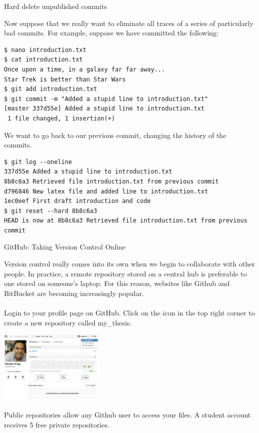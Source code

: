 \documentclass[10pt]{beamer}
\begin{document}
\begin{frame}[fragile]{Hard delete unpublished commits}

Now suppose that we really want to eliminate all traces of a series of particularly bad commits. For example, suppose we have committed the following:

\begin{lstlisting}
$ nano introduction.txt
$ cat introduction.txt
Once upon a time, in a galaxy far far away...
Star Trek is better than Star Wars
$ git add introduction.txt
$ git commit -m "Added a stupid line to introduction.txt"
[master 337d55e] Added a stupid line to introduction.txt
 1 file changed, 1 insertion(+)
\end{lstlisting}

We want to go back to our previous commit, changing the history of the commits.

\begin{lstlisting}
$ git log --oneline
337d55e	Added a stupid line to introduction.txt
8b8c6a3	Retrieved file introduction.txt from previous commit
d796846	New latex file and added line to introduction.txt
1ec0eef	First draft introduction and code
$ git reset --hard 8b8c6a3
HEAD is now at 8b8c6a3 Retrieved file introduction.txt from previous commit
\end{lstlisting}


\end{frame}




\begin{frame}[fragile]{GitHub: Taking Version Control Online}


Version control really comes into its own when we begin to collaborate with other people. In practice, a remote repository stored on a central hub is preferable to one stored on someone's laptop. For this reason, websites like Github and BitBucket are becoming increasingly popular.\\~\\

Login to your profile page on GitHub. Click on the icon in the top right corner to create a new repository called my\_thesis.
\begin{center}
\includegraphics[width=5cm]{./auxfiles/Ghub.jpg}
\end{center}
Public repositories allow any Github user to access your files. A student account receives 5 free private repositories.

\end{frame}
\end{document}
